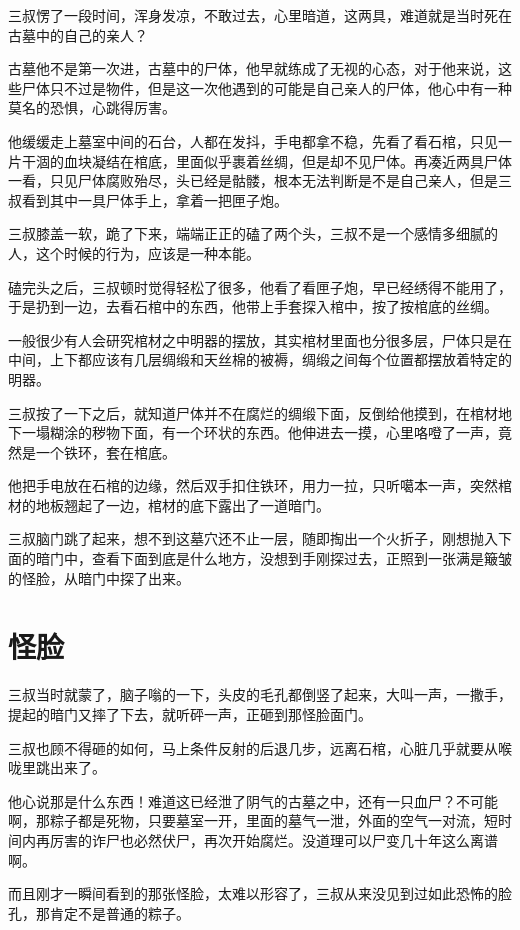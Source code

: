 三叔愣了一段时间，浑身发凉，不敢过去，心里暗道，这两具，难道就是当时死在古墓中的自己的亲人？

古墓他不是第一次进，古墓中的尸体，他早就练成了无视的心态，对于他来说，这些尸体只不过是物件，但是这一次他遇到的可能是自己亲人的尸体，他心中有一种莫名的恐惧，心跳得厉害。

他缓缓走上墓室中间的石台，人都在发抖，手电都拿不稳，先看了看石棺，只见一片干涸的血块凝结在棺底，里面似乎裹着丝绸，但是却不见尸体。再凑近两具尸体一看，只见尸体腐败殆尽，头已经是骷髅，根本无法判断是不是自己亲人，但是三叔看到其中一具尸体手上，拿着一把匣子炮。

三叔膝盖一软，跪了下来，端端正正的磕了两个头，三叔不是一个感情多细腻的人，这个时候的行为，应该是一种本能。

磕完头之后，三叔顿时觉得轻松了很多，他看了看匣子炮，早已经绣得不能用了，于是扔到一边，去看石棺中的东西，他带上手套探入棺中，按了按棺底的丝绸。

一般很少有人会研究棺材之中明器的摆放，其实棺材里面也分很多层，尸体只是在中间，上下都应该有几层绸缎和天丝棉的被褥，绸缎之间每个位置都摆放着特定的明器。

三叔按了一下之后，就知道尸体并不在腐烂的绸缎下面，反倒给他摸到，在棺材地下一塌糊涂的秽物下面，有一个环状的东西。他伸进去一摸，心里咯噔了一声，竟然是一个铁环，套在棺底。

他把手电放在石棺的边缘，然后双手扣住铁环，用力一拉，只听噶本一声，突然棺材的地板翘起了一边，棺材的底下露出了一道暗门。

三叔脑门跳了起来，想不到这墓穴还不止一层，随即掏出一个火折子，刚想抛入下面的暗门中，查看下面到底是什么地方，没想到手刚探过去，正照到一张满是簸皱的怪脸，从暗门中探了出来。

\chapter{怪脸}

三叔当时就蒙了，脑子嗡的一下，头皮的毛孔都倒竖了起来，大叫一声，一撒手，提起的暗门又摔了下去，就听砰一声，正砸到那怪脸面门。

三叔也顾不得砸的如何，马上条件反射的后退几步，远离石棺，心脏几乎就要从喉咙里跳出来了。

他心说那是什么东西！难道这已经泄了阴气的古墓之中，还有一只血尸？不可能啊，那粽子都是死物，只要墓室一开，里面的墓气一泄，外面的空气一对流，短时间内再厉害的诈尸也必然伏尸，再次开始腐烂。没道理可以尸变几十年这么离谱啊。

而且刚才一瞬间看到的那张怪脸，太难以形容了，三叔从来没见到过如此恐怖的脸孔，那肯定不是普通的粽子。

